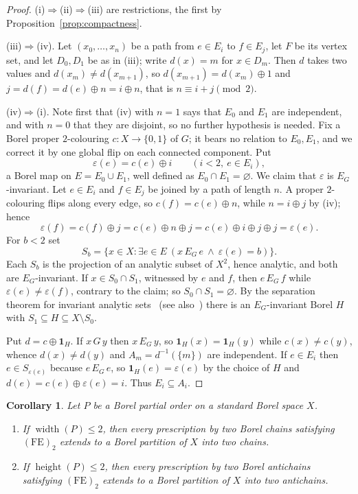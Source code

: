 \documentclass[11pt,reqno]{amsart}
\theoremstyle{plain}
\newtheorem{corollary}[theorem]{Corollary}
\theoremstyle{definition}
\theoremstyle{remark}
\newcommand{\wdt}{\operatorname{width}}
\newcommand{\hgt}{\operatorname{height}}
\begin{document}
\begin{proof}
(i)$\Rightarrow$(ii)$\Rightarrow$(iii) are restrictions, the first by
Proposition~\ref{prop:compactness}.

(iii)$\Rightarrow$(iv). Let $(x_0,\dots,x_n)$ be a path from $e\in E_i$ to
$f\in E_j$, let $F$ be its vertex set, and let $D_0,D_1$ be as in (iii); write
$d(x)=m$ for $x\in D_m$. Then $d$ takes two values and $d(x_m)\neq d(x_{m+1})$,
so $d(x_{m+1})=d(x_m)\oplus1$ and $j=d(f)=d(e)\oplus n=i\oplus n$, that is
$n\equiv i+j\pmod2$.

(iv)$\Rightarrow$(i). Note first that (iv) with $n=1$ says that $E_0$ and
$E_1$ are independent, and with $n=0$ that they are disjoint, so no further
hypothesis is needed. Fix a Borel proper $2$-colouring $c:X\to\{0,1\}$ of $G$;
it bears no relation to $E_0,E_1$, and we correct it by one global flip on each
connected component. Put
\[
\varepsilon(e)=c(e)\oplus i
\qquad (i<2,\ e\in E_i),
\]
a Borel map on $E=E_0\cup E_1$, well defined as $E_0\cap E_1=\varnothing$. We
claim that $\varepsilon$ is $E_G$-invariant. Let $e\in E_i$ and $f\in E_j$ be
joined by a path of length $n$. A proper $2$-colouring flips along every edge,
so $c(f)=c(e)\oplus n$, while $n=i\oplus j$ by (iv); hence
\[
\varepsilon(f)=c(f)\oplus j=c(e)\oplus n\oplus j
=c(e)\oplus i\oplus j\oplus j=\varepsilon(e).
\]
For $b<2$ set
\[
S_b=\{x\in X:\exists e\in E\ (x\,E_G\,e\ \wedge\ \varepsilon(e)=b)\}.
\]
Each $S_b$ is the projection of an analytic subset of $X^2$, hence analytic,
and both are $E_G$-invariant. If $x\in S_0\cap S_1$, witnessed by $e$ and $f$,
then $e\,E_G\,f$ while $\varepsilon(e)\neq\varepsilon(f)$, contrary to the
claim; so $S_0\cap S_1=\varnothing$. By the separation theorem for invariant
analytic sets~\cite{Burgess1979} (see also~\cite[Theorem~5.2.2]{Gao2009})
there is an $E_G$-invariant Borel $H$ with
$S_1\subseteq H\subseteq X\setminus S_0$.

Put $d=c\oplus\mathbf1_H$. If $x\,G\,y$ then $x\,E_G\,y$, so
$\mathbf1_H(x)=\mathbf1_H(y)$ while $c(x)\neq c(y)$, whence $d(x)\neq d(y)$ and
$A_m=d^{-1}(\{m\})$ are independent. If $e\in E_i$ then
$e\in S_{\varepsilon(e)}$ because $e\,E_G\,e$, so
$\mathbf1_H(e)=\varepsilon(e)$ by the choice of $H$ and
$d(e)=c(e)\oplus\varepsilon(e)=i$. Thus $E_i\subseteq A_i$.
\end{proof}

\begin{corollary}
\label{cor:two-orders}
Let $P$ be a Borel partial order on a standard Borel space $X$.
\begin{enumerate}
\item[\textup{(a)}] If $\wdt(P)\le2$, then every prescription by two Borel
chains satisfying $\mathrm{(FE)}_2$ extends to a Borel partition of $X$
into two chains.
\item[\textup{(b)}] If $\hgt(P)\le2$, then every prescription by two Borel
antichains satisfying $\mathrm{(FE)}_2$ extends to a Borel partition of
$X$ into two antichains.
\end{enumerate}
\end{corollary}
\end{document}
